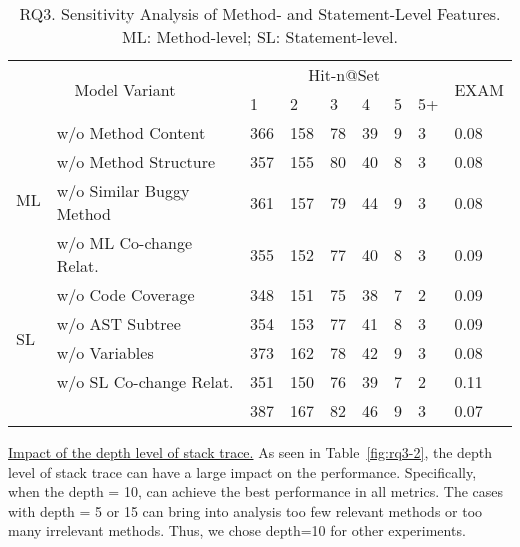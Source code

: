 \begin{table}[t]
	\caption{RQ3. Sensitivity Analysis of Method- and Statement-Level Features. ML: Method-level; SL: Statement-level.}
	{\small
		\begin{center}
			\renewcommand{\arraystretch}{1}
			\begin{tabular}{p{0.3cm}<{\centering}|p{3cm}|p{0.3cm}<{\centering}|p{0.3cm}<{\centering}|p{0.2cm}<{\centering}|p{0.2cm}<{\centering}|p{0.15cm}<{\centering}|p{0.15cm}<{\centering}|p{0.5cm}<{\centering}}
				\hline
				\multicolumn{2}{c|}{\multirow{2}{*}{Model Variant}}    & \multicolumn{6}{c|}{Hit-n@Set}& \multirow{2}{*}{EXAM}\\
				\cline{3-8}
				                 \multicolumn{2}{c|}{}   &1&2&3&4&5&5+&\\
				
				\hline 
				\multirow{4}{*}{ML}&w/o Method Content              & 366 & 158 & 78  & 39 & 9 & 3   & 0.08\\\cline{2-9}
				&w/o	Method Structure	                        & 357 & 155 & 80  & 40 & 8 & 3   & 0.08\\ \cline{2-9}
				&w/o Similar Buggy Method    	& 361 & 157 & 79  & 44 & 9 & 3   & 0.08\\ \cline{2-9}
				&w/o ML Co-change Relat.         & 355 & 152 & 77  & 40 & 8 &  3  &0.09 \\ \cline{2-9}
				\hline
				\multirow{4}{*}{SL}&w/o Code Coverage               & 348 & 151 & 75  & 38 & 7 & 2   & 0.09\\\cline{2-9}
				&w/o	AST Subtree	        & 354 & 153 & 77  & 41 & 8 & 3   & 0.09\\ \cline{2-9}
				&w/o Variables               	& 373 & 162 & 78  & 42 & 9 & 3   & 0.08\\ \cline{2-9}
				&w/o SL Co-change Relat.        & 351 & 150 & 76 & 39 & 7 &  2  & 0.11 \\ \cline{2-9}
				\hline
			&	\tool                           & 387 & 167 & 82  & 46 & 9 & 3   & 0.07\\ \cline{2-9}
				\hline
			\end{tabular}
			
			\label{fig:rq3-1}
		\end{center}
	}
\end{table}

\underline{Impact of the depth level of stack trace.} 
As seen in Table~\ref{fig:rq3-2}, the depth level of stack trace can
have a large impact on the performance. Specifically, when the depth =
10, {\tool} can achieve the best performance in all metrics. The cases
with depth = 5 or 15 can bring into analysis too few relevant methods
or too many irrelevant methods. Thus, we chose depth=10 for other
experiments.

